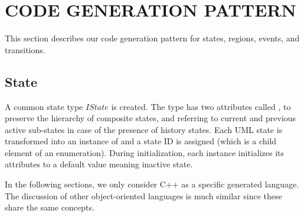 \section{\uppercase{Code generation pattern}}
\label{sec:codegen}

This section describes our code generation pattern for states, regions, events, and transitions.

%

\subsection{State}

A common state type $IState$ is created. 
The type 
has two attributes called , to preserve the hierarchy of composite states, and  referring to current and previous active sub-states in case of the presence of history states.
Each UML state is transformed into an instance of  and a state ID is assigned (which is a child element of an enumeration). 
During initialization, each instance initializes its attributes to a default value meaning inactive state. 

In the following sections, 
we only consider C++ as a specific generated language. 
The discussion of other object-oriented languages is much similar since these share the same concepts.

